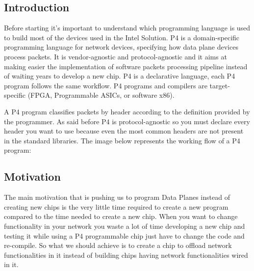 \documentclass[../sn.tex]{subfiles}
\begin{document}
\subsection{Introduction}
Before starting it’s important to understand which programming language is used to build most of the devices used in the Intel Solution.
P4 is a domain-specific programming language for network devices, specifying how data plane devices process packets.
It is vendor-agnostic and protocol-agnostic and it aims at making easier the implementation of software packets processing pipeline instead of waiting years to develop a new chip.
P4 is a declarative language, each P4 program follows the same workflow.
P4 programs and compilers are target-specific (FPGA, Programmable ASICs, or software x86).

A P4 program classifies packets by header according to the definition provided by the programmer.
As said before P4 is protocol-agnostic so you must declare every header you want to use because even the most common headers are not present in the standard libraries.
The image below represents the working flow of a P4 program:

\subsection{Motivation}
The main motivation that is pushing us to program Data Planes instead of creating new chips is the very little time required to create a new program compared to the time needed to create a new chip.
When you want to change functionality in your network you waste a lot of time developing a new chip and testing it while using a P4 programmable chip just have to change the code and re-compile.
So what we should achieve is to create a chip to offload network functionalities in it instead of building chips having network functionalities wired in it.
\end{document}
